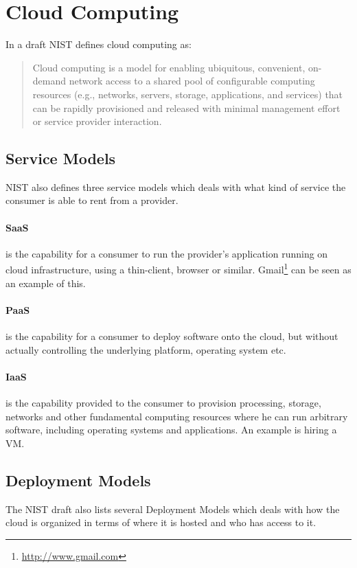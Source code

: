\documentclass[pdftex,english,10pt,b5paper,twoside]{book}
\begin{document}
\section{Cloud Computing}
In a draft\cite{cloud_nistdef} \ac{NIST} defines cloud computing as:
\begin{quote}
Cloud computing is a model for enabling ubiquitous, convenient,
on-demand network access to a shared pool of configurable computing resources
(e.g., networks, servers, storage, applications, and services) that can be
rapidly provisioned and released with minimal management effort or service
provider interaction.
\end{quote}

\subsection{Service Models}
\ac{NIST} also defines three service models which deals with what kind of
service the consumer is able to rent from a provider.

\paragraph{\ac{SaaS}} is the capability for a consumer to run the provider's
application running on cloud infrastructure, using a thin-client, browser or
similar. Gmail\footnote{\url{http://www.gmail.com}} can be seen as an example
of this.

\paragraph{\ac{PaaS}} is the capability for a consumer to deploy software onto
the cloud, but without actually controlling the underlying platform, operating
system etc.

\paragraph{\ac{IaaS}} is the capability provided to the consumer to provision
processing, storage, networks and other fundamental computing resources where
he can run arbitrary software, including operating systems and applications. An
example is hiring a \ac{VM}.

\subsection{Deployment Models}
The \ac{NIST} draft also lists several Deployment Models which deals with how
the cloud is organized in terms of where it is hosted and who has access to it.
\end{document}

